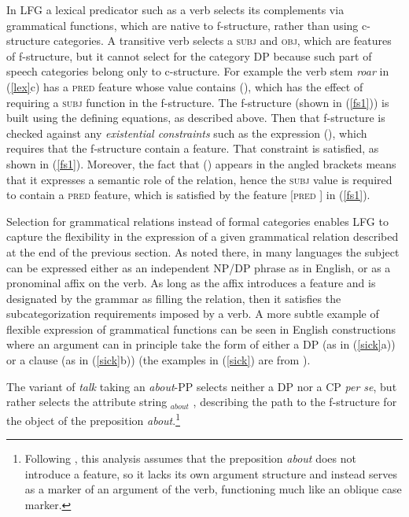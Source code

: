 In LFG a lexical predicator such as a verb selects its complements via grammatical functions, which are native to f-structure, rather than using c-structure categories.  A transitive verb selects a \textsc{subj} and \textsc{obj}, which are features of f-structure, but it cannot select for the category DP because such part of speech categories belong only to c-structure.  For example the verb stem \textit{roar} in (\ref{lex}c) has a \textsc{pred} feature whose value contains (\up {}), which has the effect of requiring a \textsc{subj} function in the f-structure.    The f-structure (shown in (\ref{fs1})) is built using the defining equations, as described above.  Then that f-structure is checked against any \textit{existential constraints} such as  the expression (\up {}), which requires that the f-structure contain a  feature.  That constraint is satisfied, as shown in (\ref{fs1}).  Moreover, the fact that (\up {}) appears in the angled brackets means that it expresses a semantic role of the  relation, hence the \textsc{subj} value is required to contain a \textsc{pred} feature, which is satisfied by the feature [\textsc{pred} ] in  (\ref{fs1}).  



Selection for grammatical relations instead of formal categories enables LFG to capture the  flexibility in the expression of a given grammatical relation described at the end of the previous section.  As noted there, in many languages the subject can be expressed either as an independent NP/DP phrase as in English, or as a pronominal affix on the verb.  As long as the affix introduces a  feature and is designated by the grammar as filling the  relation, then it satisfies the subcategorization requirements imposed by a verb.  A more subtle example of flexible expression of grammatical functions  can be seen in English constructions where an argument can in principle take the form of either a DP (as in (\ref{sick}a)) or a clause (as in (\ref{sick}b)) (the examples in (\ref{sick}) are from \cite[11--12]{BATW2016a}).  

\eal 
 \label{sick}




\zl
The variant of \textit{talk} taking an \textit{about}-PP selects neither a DP nor a CP \textit{per se}, but rather selects the attribute string  $_{about}$ , describing the path to the f-structure for the object of the preposition \textit{about}.\footnote{Following \citet[300]{BATW2016a},  this analysis assumes that the preposition \textit{about} does not introduce a   feature, so it lacks its own argument structure and instead serves as a marker of an argument of the verb, functioning much like an oblique case marker.}

